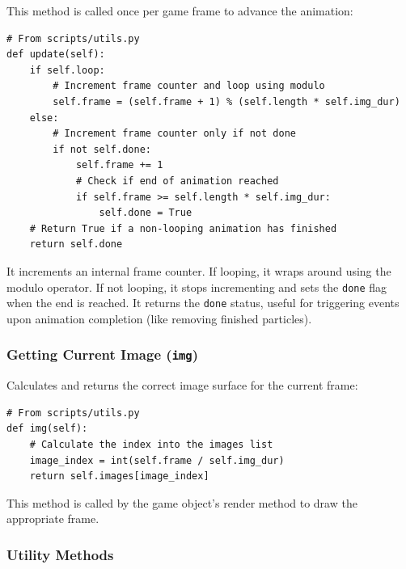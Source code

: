 \documentclass[11pt, a4paper]{article}
\begin{document}
This method is called once per game frame to advance the animation:

\begin{lstlisting}[caption={Animation.update() Logic}, label={lst:animation_update}]
# From scripts/utils.py
def update(self):
    if self.loop:
        # Increment frame counter and loop using modulo
        self.frame = (self.frame + 1) % (self.length * self.img_dur)
    else:
        # Increment frame counter only if not done
        if not self.done:
            self.frame += 1
            # Check if end of animation reached
            if self.frame >= self.length * self.img_dur:
                self.done = True
    # Return True if a non-looping animation has finished
    return self.done
\end{lstlisting}

It increments an internal frame counter. If looping, it wraps around using the modulo operator. If not looping, it stops incrementing and sets the \texttt{done} flag when the end is reached. It returns the \texttt{done} status, useful for triggering events upon animation completion (like removing finished particles).

\subsubsection{Getting Current Image (\texttt{img})}

Calculates and returns the correct image surface for the current frame:

\begin{lstlisting}[caption={Animation.img() Method}, label={lst:animation_img}]
# From scripts/utils.py
def img(self):
    # Calculate the index into the images list
    image_index = int(self.frame / self.img_dur)
    return self.images[image_index]
\end{lstlisting}

This method is called by the game object's render method to draw the appropriate frame.

\subsubsection{Utility Methods}
\end{document}
